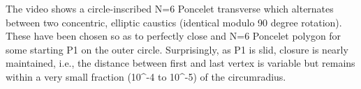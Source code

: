 The video shows a circle-inscribed N=6 Poncelet transverse which alternates between two concentric, elliptic caustics (identical  modulo 90 degree rotation). These have been chosen so as to perfectly close and N=6 Poncelet polygon for some starting P1 on the outer circle. Surprisingly, as P1 is slid, closure is nearly maintained, i.e., the distance between first and last vertex is variable but remains within a very small fraction (10^-4 to 10^-5) of the circumradius.